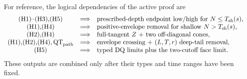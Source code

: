\documentclass[11pt]{article}
\begin{document}
For reference, the logical dependencies of the active proof are
\begingroup\small
\[
\begin{array}{ccl}
 \textup{(H1)--(H3),(H5)}&\Longrightarrow&
   \text{prescribed-depth endpoint low/high for }N\le T_{\rm sh}(s),\\
 \textup{(H1),(H4)}&\Longrightarrow&
   \text{positive-envelope removal for shallow }N>T_{\rm sh}(s),\\
 \textup{(H2),(H4)}&\Longrightarrow&
   \text{full-tangent }Z\text{ + two off-diagonal cones},\\
 \textup{(H1),(H2),(H4)},\mathrm{QT}_{\rm path}&\Longrightarrow&
   \text{envelope crossing + }(L,T,r)\text{ deep-tail removal},\\
 \textup{(H5)}&\Longrightarrow&
   \text{typed DQ limits plus the two-cutoff face limit}.
\end{array}
\]
\endgroup
These outputs are combined only after their types and time ranges have been
fixed.
\end{document}
